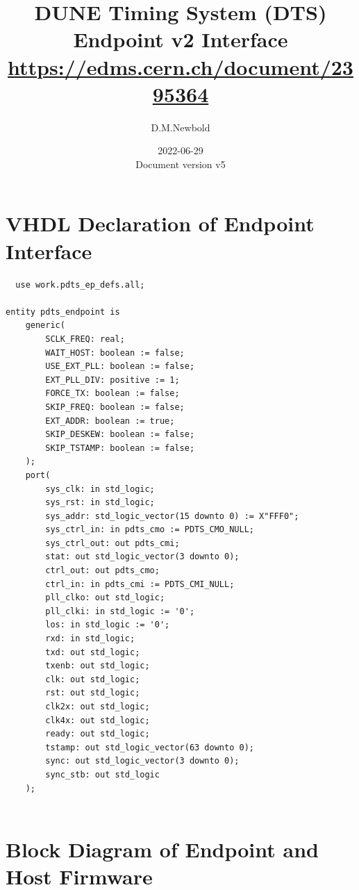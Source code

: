 \documentclass{article}
\begin{document}
\title{DUNE Timing System (DTS) Endpoint v2 Interface \\\url{https://edms.cern.ch/document/2395364} }

\author{D.M.Newbold}
\date{2022-06-29\\\normalsize Document version v5}

\maketitle
\newpage
\section{VHDL Declaration of Endpoint Interface}
\begin{verbatim}
  use work.pdts_ep_defs.all;

entity pdts_endpoint is
    generic(
        SCLK_FREQ: real;
        WAIT_HOST: boolean := false;
        USE_EXT_PLL: boolean := false;
        EXT_PLL_DIV: positive := 1;
        FORCE_TX: boolean := false;
        SKIP_FREQ: boolean := false;
        EXT_ADDR: boolean := true;
        SKIP_DESKEW: boolean := false;
        SKIP_TSTAMP: boolean := false;
    );
    port(
        sys_clk: in std_logic;
        sys_rst: in std_logic;
        sys_addr: std_logic_vector(15 downto 0) := X"FFF0";
        sys_ctrl_in: in pdts_cmo := PDTS_CMO_NULL;
        sys_ctrl_out: out pdts_cmi;
        stat: out std_logic_vector(3 downto 0);
        ctrl_out: out pdts_cmo;
        ctrl_in: in pdts_cmi := PDTS_CMI_NULL;
        pll_clko: out std_logic;
        pll_clki: in std_logic := '0';
        los: in std_logic := '0';
        rxd: in std_logic;
        txd: out std_logic;
        txenb: out std_logic;
        clk: out std_logic;
        rst: out std_logic;
        clk2x: out std_logic;
        clk4x: out std_logic;
        ready: out std_logic;
        tstamp: out std_logic_vector(63 downto 0);
        sync: out std_logic_vector(3 downto 0);
        sync_stb: out std_logic
    );


\end{verbatim}

\section{Block Diagram of Endpoint and Host Firmware}
\end{document}
